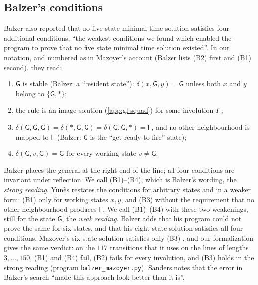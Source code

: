 \subsection{Balzer's conditions}\label{sec:balzer}

Balzer \cite[p.~37]{Balzer67} also reported that no five-state minimal-time
solution satisfies four additional conditions, ``the weakest conditions we
found which enabled the program to prove that no five state minimal time
solution existed''. In our notation, and numbered as in Mazoyer's account
\cite[\S7]{Mazoyer86Lyon} (Balzer lists (B2) first and (B1) second), they
read:
\begin{enumerate}[label=(B\arabic*)]
\item $\mathsf G$ is stable (Balzer: a ``resident state''):
  $\delta(x,\mathsf G,y)=\mathsf G$ unless both $x$ and $y$ belong to
  $\{\mathsf G,\ast\}$;
\item the rule is an image solution (\cref{app:gl-squad}) for some
  involution $I$ \cite[p.~32]{Balzer67};
\item $\delta(\mathsf G,\mathsf G,\mathsf G)=\delta(\ast,\mathsf G,\mathsf
  G)=\delta(\mathsf G,\mathsf G,\ast)=\mathsf F$, and no other
  neighbourhood is mapped to $\mathsf F$ (Balzer: $\mathsf G$ is the
  ``get-ready-to-fire'' state);
\item $\delta(\mathsf G,v,\mathsf G)=\mathsf G$ for every working state
  $v\neq\mathsf G$.
\end{enumerate}
Balzer places the general at the right end of the line; all four conditions
are invariant under reflection. We call (B1)--(B4), which is Balzer's
wording, the \emph{strong reading}. Yun\`es \cite[\S2.7]{Yunes93} restates
the conditions for arbitrary states and in a weaker form: (B1) only for
working states $x,y$, and (B3) without the requirement that no other
neighbourhood produces $\mathsf F$. We call (B1)--(B4) with these two
weakenings, still for the state $\mathsf G$, the \emph{weak reading}.
Balzer adds that his program could not prove the same for six states, and
that his eight-state solution satisfies all four conditions. Mazoyer's six-state
solution satisfies only (B3) \cite{Mazoyer86Lyon}, and our formalization
gives the same verdict: on the
$117$ transitions that it uses on the lines of lengths $3,\dots,150$, (B1)
and (B4) fail, (B2) fails for every involution, and (B3) holds in the strong
reading (program \texttt{balzer\_mazoyer.py}). Sanders \cite{Sanders94}
notes that the error in Balzer's search ``made this approach look better
than it is''.

